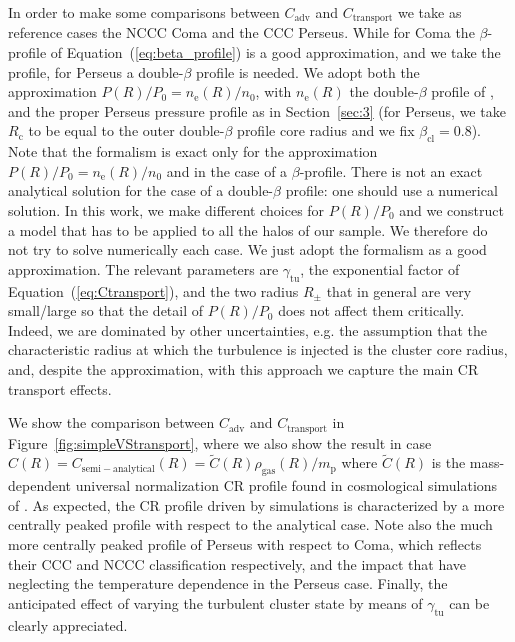 \documentclass[traditabstract]{aa}
\newcommand{\rmn}{\mathrm}
\begin{document}
\begin{appendix}
In order to make some comparisons between $C_{\rmn{adv}}$ and $C_{\rmn{transport}}$ we take as reference cases the NCCC Coma and the CCC Perseus. While for Coma the $\beta$-profile of Equation~(\ref{eq:beta_profile}) is a good approximation, and we take the \cite{1992A&A...259L..31B} profile, for Perseus a double-$\beta$ profile is needed. We adopt both the approximation $P(R)/P_{0}=n_{\rmn{e}}(R)/n_{0}$, with $n_{\rmn{e}}(R)$ the double-$\beta$ profile of \cite{2003ApJ...590..225C}, and the proper Perseus pressure profile as in Section~\ref{sec:3} (for Perseus, we take $R_{\rmn{c}}$ to be equal to the outer double-$\beta$ profile core radius and we fix $\beta_{\rmn{cl}}=0.8$). Note that the \cite{2011A&A...527A..99E} formalism is exact only for the approximation $P(R)/P_{0}=n_{\rmn{e}}(R)/n_{0}$ and in the case of a $\beta$-profile. There is not an exact analytical solution for the case of a double-$\beta$ profile: one should use a numerical solution. In this work, we make different choices for $P(R)/P_{0}$ and we construct a model that has to be applied to all the halos of our sample. We therefore do not try to solve numerically each case. We just adopt the \cite{2011A&A...527A..99E} formalism as a good approximation. The relevant parameters are $\gamma_{\rmn{tu}}$, the exponential factor of Equation~(\ref{eq:Ctransport}), and the two radius $R_{\pm}$ that in general are very small/large so that the detail of $P(R)/P_{0}$ does not affect them critically. Indeed, we are dominated by other uncertainties, e.g. the assumption that the characteristic radius at which the turbulence is injected is the cluster core radius, and, despite the approximation, with this approach we capture the main CR transport effects.

We show the comparison between $C_{\rmn{adv}}$ and $C_{\rmn{transport}}$ in Figure~\ref{fig:simpleVStransport}, where we also show the result in case $C(R)=C_{\rmn{semi-analytical}}(R)=\tilde{C}(R)\rho_{\rmn{\rmn{gas}}}(R)/m_{\rmn{p}}$ where $\tilde{C}(R)$ is the mass-dependent universal normalization CR profile found in cosmological simulations of \cite{2010MNRAS.409..449P}. As expected, the CR profile driven by simulations is characterized by a more centrally peaked profile with respect to the analytical case. Note also the much more centrally peaked profile of Perseus with respect to Coma, which reflects their CCC and NCCC classification respectively, and the impact that have neglecting the temperature dependence in the Perseus case. Finally, the anticipated effect of varying the turbulent cluster state by means of $\gamma_{\rmn{tu}}$ can be clearly appreciated.


\end{appendix}
\end{document}
